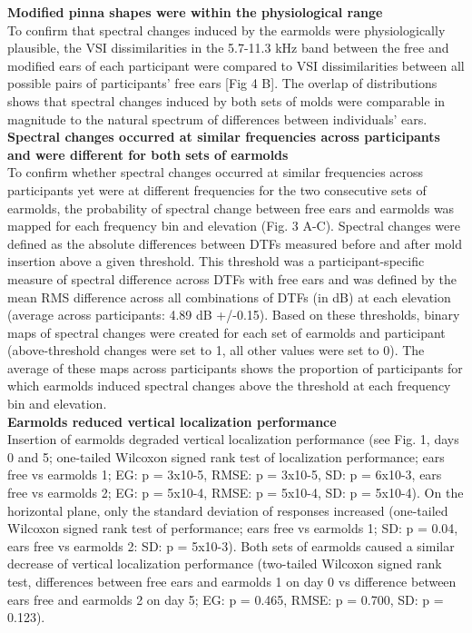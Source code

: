 \begin{multicols}{2}
\noindent %

\noindent\textbf{Modified pinna shapes were within the physiological range}\\
To confirm that spectral changes induced by the earmolds were physiologically plausible, the VSI dissimilarities in the 5.7-11.3 kHz band between the free and modified ears of each participant were compared to VSI dissimilarities between all possible pairs of participants’ free ears [Fig 4 B]. The overlap of distributions shows that spectral changes induced by both sets of molds were comparable in magnitude to the natural spectrum of differences between individuals’ ears.\\

\noindent\textbf{Spectral changes occurred at similar frequencies across participants and were different for both sets of earmolds}\\
To confirm whether spectral changes occurred at similar frequencies across participants yet were at different frequencies for the two consecutive sets of earmolds, the probability of spectral change between free ears and earmolds was mapped for each frequency bin and elevation (Fig. 3 A-C). Spectral changes were defined as the absolute differences between DTFs measured before and after mold insertion above a given threshold. This threshold was a participant-specific measure of spectral difference across DTFs with free ears and was defined by the mean RMS difference across all combinations of DTFs (in dB) at each elevation (average across participants: 4.89 dB +/-0.15). Based on these thresholds, binary maps of spectral changes were created for each set of earmolds and participant (above-threshold changes were set to 1, all other values were set to 0). The average of these maps across participants shows the proportion of participants for which earmolds induced spectral changes above the threshold at each frequency bin and elevation.\\




\noindent \textbf{Earmolds reduced vertical localization performance}\\
Insertion of earmolds degraded vertical localization performance (see Fig. 1, days 0 and 5; one-tailed Wilcoxon signed rank test of localization performance; ears free vs earmolds 1; EG: p = 3x10-5, RMSE: p = 3x10-5, SD: p = 6x10-3, ears free vs earmolds 2; EG: p = 5x10-4, RMSE: p = 5x10-4, SD: p = 5x10-4). On the horizontal plane, only the standard deviation of responses increased (one-tailed Wilcoxon signed rank test of performance; ears free vs earmolds 1; SD: p = 0.04, ears free vs earmolds 2: SD: p = 5x10-3). Both sets of earmolds caused a similar decrease of vertical localization performance (two-tailed Wilcoxon signed rank test, differences between free ears and earmolds 1 on day 0 vs difference between ears free and earmolds 2 on day 5; EG: p = 0.465, RMSE: p = 0.700, SD: p = 0.123).\\ %
 

\end{multicols}
